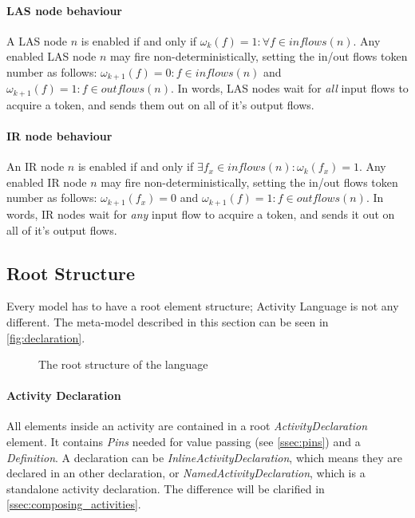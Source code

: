 \paragraph{LAS node behaviour}
A LAS node \(n\) is enabled if and only if \(\omega_k(f) = 1 : \forall f \in inflows(n)\). Any enabled LAS node \(n\) may fire non-deterministically, setting the in/out flows token number as follows: \( \omega_{k + 1}(f) = 0 : f \in inflows(n) \) and \( \omega_{k + 1}(f) = 1 : f \in outflows(n) \). In words, LAS nodes wait for \emph{all} input flows to acquire a token, and sends them out on all of it's output flows.

\paragraph{IR node behaviour}
An IR node \(n\) is enabled if and only if \( \exists f_x \in inflows(n) :  \omega_k(f_x) = 1\). Any enabled IR node \(n\) may fire non-deterministically, setting the in/out flows token number as follows: \( \omega_{k + 1}(f_x) = 0 \) and \( \omega_{k + 1}(f) = 1 : f \in outflows(n) \). In words, IR nodes wait for \emph{any} input flow to acquire a token, and sends it out on all of it's output flows.

\subsection{Root Structure}\label{ssec:root_structure}

Every model has to have a root element structure; Activity Language is not any different. The meta-model described in this section can be seen in \autoref{fig:declaration}.

\begin{figure}[!ht]
	\centering
	
	\caption{The root structure of the language}
	\label{fig:declaration}
\end{figure}

\paragraph{Activity Declaration}\label{par:activity_declaration}

All elements inside an activity are contained in a root \emph{ActivityDeclaration} element. It contains \emph{Pins} needed for value passing (see \autoref{ssec:pins}) and a \emph{Definition}. A declaration can be \emph{InlineActivityDeclaration}, which means they are declared in an other declaration, or \emph{NamedActivityDeclaration}, which is a standalone activity declaration. The difference will be clarified in \autoref{ssec:composing_activities}.

